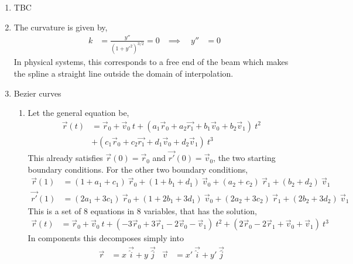 \begin{enumerate}
    \item TBC

    \item The curvature is given by,
          \begin{align}
              k                  & = \frac{y''}{(1 + y'^2)^{3/2}} = 0 &
              \implies \quad y'' & = 0
          \end{align}
          In physical systems, this corresponds to a free end of the beam which makes
          the spline a straight line outside the domain of interpolation.

    \item Bezier curves
          \begin{enumerate}
              \item Let the general equation be,
                    \begin{align}
                        \vec{r}(t) & = \vec{r}_0 + \vec{v}_0\ t + (a_1 \vec{r}_0
                        + a_2 \vec{r_1}
                        + b_1 \vec{v}_0 + b_2\vec{v}_1)\ t^2                          \\
                                   & + (c_1 \vec{r}_0 + c_2 \vec{r_1} + d_1 \vec{v}_0
                        + d_2\vec{v}_1)\ t^3
                    \end{align}
                    This already satisfies $ \vec{r}(0) = \vec{r}_0 $ and
                    $ \vec{r'}(0) = \vec{v}_0 $, the two starting boundary conditions.
                    For the other two boundary conditions,
                    \begin{align}
                        \vec{r}(1)  & = (1 + a_1 + c_1)\ \vec{r}_0 + (1 + b_1 + d_1)
                        \ \vec{v}_0 +
                        (a_2 + c_2)\ \vec{r}_1 + (b_2 + d_2)\ \vec{v}_1              \\
                        \vec{r'}(1) & = (2a_1 + 3c_1)\ \vec{r}_0 + (1 + 2b_1 + 3d_1)
                        \ \vec{v}_0 +
                        (2a_2 + 3c_2)\ \vec{r}_1 + (2b_2 + 3d_2)\ \vec{v}_1
                    \end{align}
                    This is a set of 8 equations in 8 variables, that has the solution,
                    \begin{align}
                        \vec{r}(t) & = \vec{r}_0 + \vec{v}_0\ t + (-3\vec{r}_0
                        + 3\vec{r}_1
                        - 2\vec{v}_0 - \vec{v}_1)\ t^2
                        + (2\vec{r}_0 - 2\vec{r}_1 + \vec{v}_0 + \vec{v}_1)\ t^3
                    \end{align}
                    In components this decomposes simply into
                    \begin{align}
                        \vec{r} & = x\ \vec{\hat{i}} + y\ \vec{\hat{j}}   &
                        \vec{v} & = x'\ \vec{\hat{i}} + y'\ \vec{\hat{j}}
                    \end{align}


\end{enumerate}
\end{enumerate}
